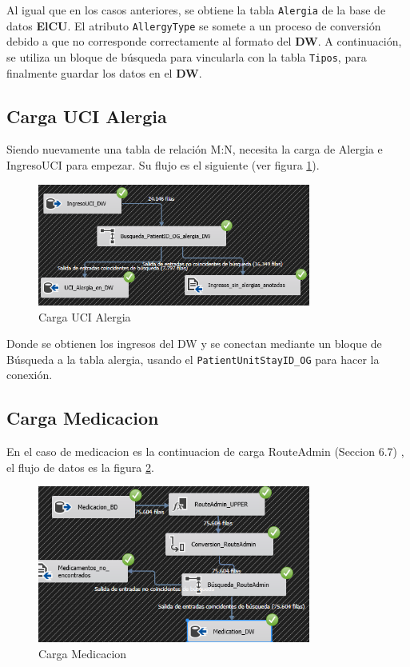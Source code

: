 \documentclass[12pt, a4paper, twoside]{article}
\begin{document}
	Al igual que en los casos anteriores, se obtiene la tabla \texttt{Alergia} de la base de datos \textbf{ElCU}. El atributo \texttt{AllergyType} se somete a un proceso de conversión debido a que no corresponde correctamente al formato del \textbf{DW}. A continuación, se utiliza un bloque de búsqueda para vincularla con la tabla \texttt{Tipos}, para finalmente guardar los datos en el \textbf{DW}.
	
	
	\subsection{Carga UCI Alergia}
	
	Siendo nuevamente una tabla de relación M:N, necesita la carga de Alergia e IngresoUCI para empezar. Su flujo es el siguiente (ver figura  \ref{fig:37}).
	
	\begin{figure}[H]
		\centering
		\includegraphics[width=0.8\textwidth]{image/116_UCI_alergia.png}
		\caption{Carga  UCI Alergia}
		\label{fig:37}
	\end{figure}
	
	Donde se obtienen los ingresos del DW y se conectan mediante un bloque de Búsqueda a la tabla alergia, usando el \texttt{PatientUnitStayID\_OG} para hacer la conexión. 
	\subsection{Carga Medicacion}
	
	En el caso de medicacion es la continuacion de carga RouteAdmin (Seccion 6.7) , el flujo de datos es la figura \ref{fig:38}.
	
	\begin{figure}[H]
		\centering
		\includegraphics[width=0.8\textwidth]{image/118_Medicacion.png}
		\caption{Carga Medicacion}
		\label{fig:38}
	\end{figure}
	
\end{document}
